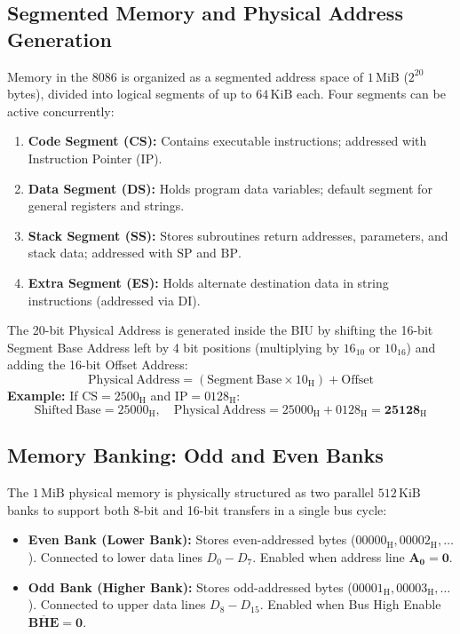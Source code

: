 \documentclass[12pt,a4paper]{article}
\begin{document}
\subsection{Segmented Memory and Physical Address Generation}
Memory in the 8086 is organized as a segmented address space of $1\,\mathrm{MiB}$ ($2^{20}$ bytes), divided into logical segments of up to $64\,\mathrm{KiB}$ each. Four segments can be active concurrently:
\begin{enumerate}[leftmargin=*]
  \item \textbf{Code Segment (CS):} Contains executable instructions; addressed with Instruction Pointer ($\mathrm{IP}$).
  \item \textbf{Data Segment (DS):} Holds program data variables; default segment for general registers and strings.
  \item \textbf{Stack Segment (SS):} Stores subroutines return addresses, parameters, and stack data; addressed with $\mathrm{SP}$ and $\mathrm{BP}$.
  \item \textbf{Extra Segment (ES):} Holds alternate destination data in string instructions (addressed via $\mathrm{DI}$).
\end{enumerate}

\begin{tcolorbox}[formulabox, title={8086 Physical Address Calculation}]
The 20-bit Physical Address is generated inside the BIU by shifting the 16-bit Segment Base Address left by 4 bit positions (multiplying by $16_{10}$ or $10_{16}$) and adding the 16-bit Offset Address:
\[
\mathbf{\mathrm{Physical\ Address}} = (\mathrm{Segment\ Base} \times 10_{\mathrm{H}}) + \mathrm{Offset}
\]
\textbf{Example:} If $\mathrm{CS} = 2500_{\mathrm{H}}$ and $\mathrm{IP} = 0128_{\mathrm{H}}$:
\[
\mathrm{Shifted\ Base} = 25000_{\mathrm{H}}, \quad \mathrm{Physical\ Address} = 25000_{\mathrm{H}} + 0128_{\mathrm{H}} = \mathbf{25128_{\mathrm{H}}}
\]
\end{tcolorbox}

\subsection{Memory Banking: Odd and Even Banks}
The $1\,\mathrm{MiB}$ physical memory is physically structured as two parallel $512\,\mathrm{KiB}$ banks to support both 8-bit and 16-bit transfers in a single bus cycle:
\begin{itemize}[leftmargin=*]
  \item \textbf{Even Bank (Lower Bank):} Stores even-addressed bytes ($00000_{\mathrm{H}}, 00002_{\mathrm{H}}, \dots$). Connected to lower data lines $D_0-D_7$. Enabled when address line $\mathbf{A_0 = 0}$.
  \item \textbf{Odd Bank (Higher Bank):} Stores odd-addressed bytes ($00001_{\mathrm{H}}, 00003_{\mathrm{H}}, \dots$). Connected to upper data lines $D_8-D_{15}$. Enabled when Bus High Enable $\mathbf{\overline{BHE} = 0}$.
\end{itemize}
\end{document}
